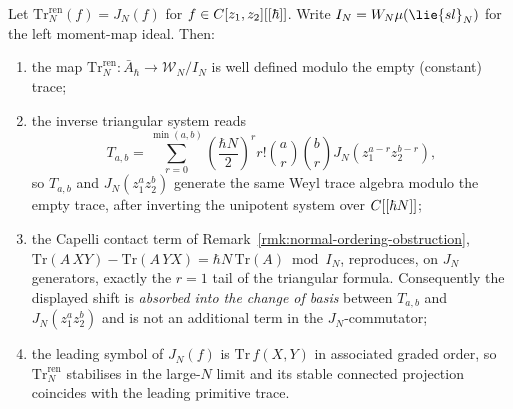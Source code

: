 \documentclass[11pt]{memoir}
\begin{document}
\begin{lem}\label{lem:capelli-renormalized-stable-trace}
  Let $\mathrm{Tr}^{\mathrm{ren}}_N(f)=J_N(f)$ for
  $f\in C[z_1,z_2][[\hbar]]$. Write
  $I_N=\mathcal W_N\widehat\mu(\lie{sl}_N)$ for the left moment-map ideal.
  Then:
  \begin{enumerate}
    \item the map
      $\mathrm{Tr}^{\mathrm{ren}}_N\colon\bar A_\hbar
        \longrightarrow\mathcal W_N/I_N$
      is well defined modulo the empty (constant) trace;
    \item the inverse triangular system reads
      $$T_{a,b}=\sum_{r=0}^{\min(a,b)}
          \left(\frac{\hbar N}{2}\right)^r r!\binom{a}{r}\binom{b}{r}
          J_N(z_1^{a-r}z_2^{b-r}),$$
      so $T_{a,b}$ and $J_N(z_1^az_2^b)$ generate the same Weyl trace
      algebra modulo the empty trace, after inverting the unipotent system
      over $C[[\hbar N]]$;
    \item the Capelli contact term of
      Remark~\ref{rmk:normal-ordering-obstruction},
      $\mathrm{Tr}(A\,XY)-\mathrm{Tr}(A\,YX)
        =\hbar N\,\mathrm{Tr}(A)\bmod I_N$, reproduces, on $J_N$
      generators, exactly the $r=1$ tail of the triangular formula.
      Consequently the displayed shift is \emph{absorbed into the
      change of basis} between $T_{a,b}$ and $J_N(z_1^az_2^b)$ and is not an
      additional term in the $J_N$-commutator;
    \item the leading symbol of $J_N(f)$ is $\mathrm{Tr}\,f(X,Y)$ in
      associated graded order, so $\mathrm{Tr}^{\mathrm{ren}}_N$ stabilises
      in the large-$N$ limit and its stable connected projection coincides
      with the leading primitive trace.
  \end{enumerate}
\end{lem}
\end{document}
